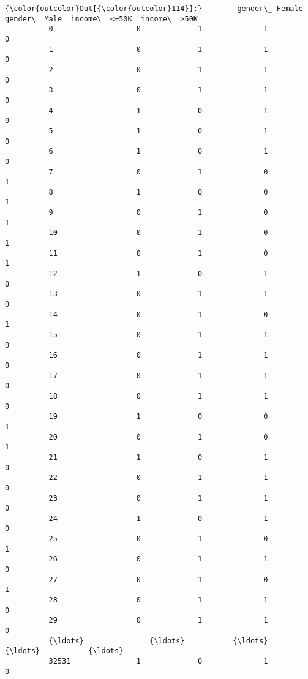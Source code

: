 \documentclass[11pt]{article}
\begin{document}
\begin{Verbatim}[commandchars=\\\{\}]
{\color{outcolor}Out[{\color{outcolor}114}]:}        gender\_ Female  gender\_ Male  income\_ <=50K  income\_ >50K
          0                   0             1              1             0
          1                   0             1              1             0
          2                   0             1              1             0
          3                   0             1              1             0
          4                   1             0              1             0
          5                   1             0              1             0
          6                   1             0              1             0
          7                   0             1              0             1
          8                   1             0              0             1
          9                   0             1              0             1
          10                  0             1              0             1
          11                  0             1              0             1
          12                  1             0              1             0
          13                  0             1              1             0
          14                  0             1              0             1
          15                  0             1              1             0
          16                  0             1              1             0
          17                  0             1              1             0
          18                  0             1              1             0
          19                  1             0              0             1
          20                  0             1              0             1
          21                  1             0              1             0
          22                  0             1              1             0
          23                  0             1              1             0
          24                  1             0              1             0
          25                  0             1              0             1
          26                  0             1              1             0
          27                  0             1              0             1
          28                  0             1              1             0
          29                  0             1              1             0
          {\ldots}               {\ldots}           {\ldots}            {\ldots}           {\ldots}
          32531               1             0              1             0

\end{Verbatim}
\end{document}
